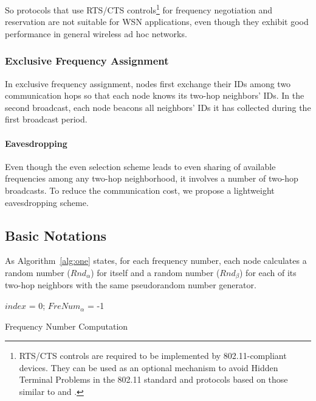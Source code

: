 \documentclass[format=acmsmall, review=false]{acmart}
\begin{document}
So protocols \cite{Bahl-02, Culler-01,Zhou-06,Adya-01,
	Tzamaloukas-01, Akyildiz-01} that use RTS/CTS
controls\footnote{RTS/CTS controls are required to be implemented by
	802.11-compliant devices. They can be used as an optional mechanism
	to avoid Hidden Terminal Problems in the 802.11 standard and
	protocols based on those similar to \citet{Akyildiz-01} and
	\citet{Adya-01}.} for frequency negotiation and reservation are not
suitable for WSN applications, even though they exhibit good
performance in general wireless ad hoc
networks.

\subsubsection{Exclusive Frequency Assignment}


In exclusive frequency assignment, nodes first exchange their IDs
among two communication hops so that each node knows its two-hop
neighbors' IDs. In the second broadcast, each node beacons all
neighbors' IDs it has collected during the first broadcast period.

\paragraph{Eavesdropping}

Even though the even selection scheme leads to even sharing of
available frequencies among any two-hop neighborhood, it involves a
number of two-hop broadcasts. To reduce the communication cost, we
propose a lightweight eavesdropping scheme.

\subsection{Basic Notations}

As Algorithm~\ref{alg:one} states, for each frequency
number, each node calculates a random number (${\textit{Rnd}}_{\alpha}$) for
itself and a random number (${\textit{Rnd}}_{\beta}$) for each of its two-hop
neighbors with the same pseudorandom number generator.

\begin{algorithm}[t]
	\SetAlgoNoLine
	$index$ = 0; $FreNum_{\alpha}$ = -1\;
	\caption{Frequency Number Computation}
	\label{alg:one}
\end{algorithm}
\end{document}
